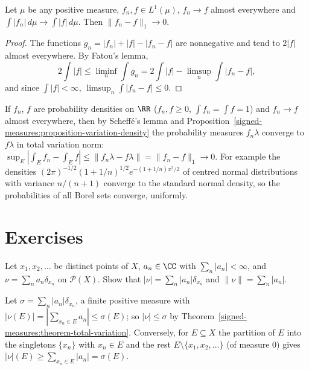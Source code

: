\begin{corollary}\label{signed-measures:corollary-scheffe}
Let $\mu$ be any positive measure, $f_n, f \in L^1(\mu)$, $f_n \to f$ almost everywhere and $\int|f_n|\,d\mu \to \int|f|\,d\mu$. Then $\|f_n - f\|_1 \to 0$.
\end{corollary}

\begin{proof}
The functions $g_n = |f_n| + |f| - |f_n - f|$ are nonnegative and tend to $2|f|$ almost everywhere. By Fatou's lemma,
\[
2\int|f| \leq \liminf_n\int g_n = 2\int|f| - \limsup_n\int|f_n - f|,
\]
and since $\int|f| < \infty$, $\limsup_n\int|f_n - f| \leq 0$.
\end{proof}

\begin{example}\label{signed-measures:example-scheffe}
If $f_n$, $f$ are probability densities on $\RR$ ($f_n, f \geq 0$, $\int f_n = \int f = 1$) and $f_n \to f$ almost everywhere, then by Scheff\'e's lemma and
Proposition~\ref{signed-measures:proposition-variation-density} the probability measures $f_n\lambda$ converge to $f\lambda$ in total variation norm:
$\sup_E|\int_Ef_n - \int_Ef| \leq \|f_n\lambda - f\lambda\| = \|f_n - f\|_1 \to 0$. For example the densities $(2\pi)^{-1/2}(1 + 1/n)^{1/2}e^{-(1 + 1/n)x^2/2}$ of centred normal distributions with variance
$n/(n + 1)$ converge to the standard normal density, so the probabilities of all Borel sets converge, uniformly.
\end{example}

\section{Exercises}\label{signed-measures:section-exercises}

\begin{exercise}\label{signed-measures:exercise-atoms}
Let $x_1, x_2, \ldots$ be distinct points of $X$, $a_n \in \CC$ with $\sum_n|a_n| < \infty$, and $\nu = \sum_na_n\delta_{x_n}$ on $\mathcal{P}(X)$. Show that $|\nu| = \sum_n|a_n|\delta_{x_n}$ and
$\|\nu\| = \sum_n|a_n|$.
\end{exercise}

\begin{solution}
Let $\sigma = \sum_n|a_n|\delta_{x_n}$, a finite positive measure with $|\nu(E)| = |\sum_{x_n \in E}a_n| \leq \sigma(E)$; so $|\nu| \leq \sigma$ by Theorem~\ref{signed-measures:theorem-total-variation}.
Conversely, for $E \subseteq X$ the partition of $E$ into the singletons $\{x_n\}$ with $x_n \in E$ and the rest $E \setminus \{x_1, x_2, \ldots\}$ (of measure $0$) gives
$|\nu|(E) \geq \sum_{x_n \in E}|a_n| = \sigma(E)$.
\end{solution}

